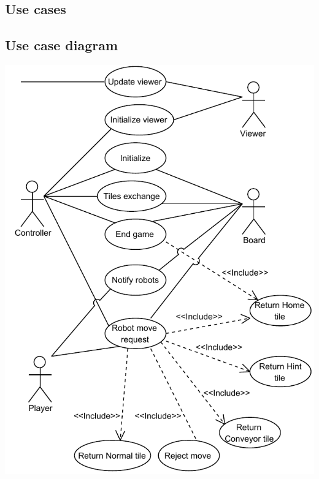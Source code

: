 \subsection{Use cases}
	
\subsection{Use case diagram}
	\includegraphics[width=\linewidth]{usecases/diagram.pdf}	

